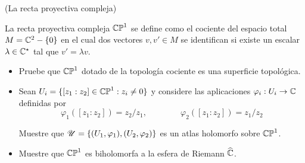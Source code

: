 \begin{exercise}
(La recta proyectiva compleja)

\vspace{2mm}

\noindent La recta proyectiva compleja $\mathbb {CP}^1$ se define como el cociente del espacio total $M = \mathbb C^2 - \{ 0 \}$ en el cual dos vectores $v, v' \in M$ se identifican si existe un escalar $\lambda \in \mathbb C^\star$ tal que $v' = \lambda v$.

\begin{itemize}
    \item Pruebe que $\mathbb {CP}^1$ dotado de la topología cociente es una superficie topológica.
    
    \item Sean $U_i = \{ [z_1 : z_2] \in \mathbb {CP}^1 : z_i \ne 0 \}$ y considere las aplicaciones $\varphi_i : U_i \to \mathbb C$ definidas por
    $$\varphi_1([z_1 : z_2]) = z_2 / z_1, \qquad \qquad \varphi_2([z_1 : z_2]) = z_1 / z_2$$
    
    Muestre que $\mathscr U = \{ (U_1, \varphi_1), (U_2, \varphi_2) \}$ es un atlas holomorfo sobre $\mathbb {CP}^1$.
    
    \item Muestre que $\mathbb {CP}^1$ es biholomorfa a la esfera de Riemann $\widehat {\mathbb C}$.
\end{itemize}
\end{exercise}

